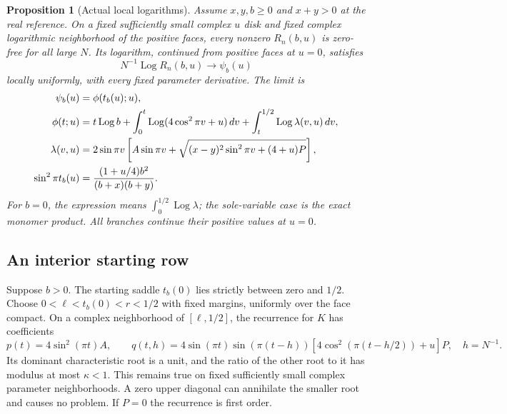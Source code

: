\documentclass[11pt]{article}
\numberwithin{equation}{section}
\newtheorem{proposition}[theorem]{Proposition}
\theoremstyle{definition}\newtheorem{definition}[theorem]{Definition}
\theoremstyle{remark}\newtheorem{remark}[theorem]{Remark}
\newcommand{\Loga}{\operatorname{Log}}
\begin{document}
\begin{proposition}[Actual local logarithms]\label{sa:local-log}
Assume $x,y,b\ge0$ and $x+y>0$ at the real reference.
On a fixed sufficiently small complex $u$ disk and fixed complex
logarithmic neighborhood of the positive faces, every nonzero
$R_n(b,u)$ is zero-free for all large $N$. Its logarithm, continued
from positive faces at $u=0$, satisfies
\begin{equation}\label{sa:log-limit}
 N^{-1}\Loga R_n(b,u)\longrightarrow\psi_b(u)
\end{equation}
locally uniformly, with every fixed parameter derivative. The limit is
\begin{align}
 \psi_b(u)&=\phi(t_b(u);u),\notag\\
 \phi(t;u)&=t\Loga b+\int_0^t\Loga(4\cos^2\pi v+u)\,dv
                         +\int_t^{1/2}\Loga\lambda(v,u)\,dv,
                                                       \label{sa:phase}\\
 \lambda(v,u)&=2\sin\pi v\left[A\sin\pi v+
       \sqrt{(x-y)^2\sin^2\pi v+(4+u)P}\right],\notag\\
 \sin^2\pi t_b(u)&=\frac{(1+u/4)b^2}{(b+x)(b+y)}.\notag
\end{align}
For $b=0$, the expression means $\int_0^{1/2}\Loga\lambda$;
the sole-variable case is the exact monomer product.
All branches continue their positive values at $u=0$.
\end{proposition}

\subsection{An interior starting row}
Suppose $b>0$. The starting saddle $t_b(0)$ lies strictly between
zero and $1/2$. Choose $0<\ell<t_b(0)<r<1/2$ with fixed margins,
uniformly over the face compact. On a complex neighborhood of
$[\ell,1/2]$, the recurrence for $K$ has coefficients
\[
 p(t)=4\sin^2(\pi t)A,\qquad
 q(t,h)=4\sin(\pi t)\sin(\pi(t-h))
                      [4\cos^2(\pi(t-h/2))+u]P,
                         \quad h=N^{-1}.
\]
Its dominant characteristic root is a unit, and the ratio of the
other root to it has modulus at most $\kappa<1$. This remains true
on fixed sufficiently small complex parameter neighborhoods. A zero
upper diagonal can annihilate the smaller root and causes no problem.
If $P=0$ the recurrence is first order.
\end{document}
